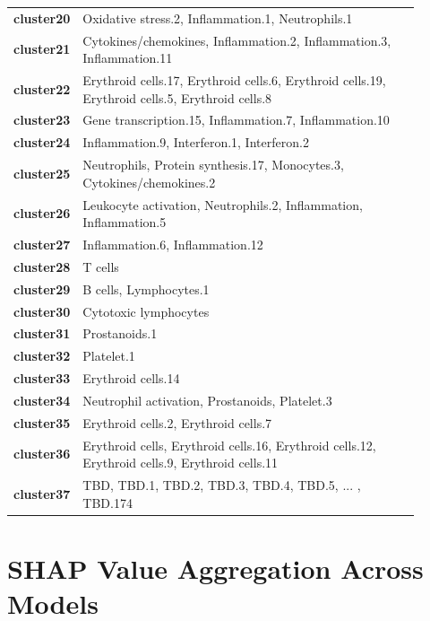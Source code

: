 \documentclass[12pt,a4paper]{report}
\begin{document}
\begin{longtable}{l p{0.9\linewidth} }
\addlinespace
\textbf{cluster20} & Oxidative stress.2, Inflammation.1, Neutrophils.1 \\
\addlinespace
\textbf{cluster21} & Cytokines/chemokines, Inflammation.2, Inflammation.3, Inflammation.11 \\
\addlinespace
\textbf{cluster22} & Erythroid cells.17, Erythroid cells.6, Erythroid cells.19, Erythroid cells.5, Erythroid cells.8 \\
\addlinespace
\textbf{cluster23} & Gene transcription.15, Inflammation.7, Inflammation.10 \\
\addlinespace
\textbf{cluster24} & Inflammation.9, Interferon.1, Interferon.2 \\
\addlinespace
\textbf{cluster25} & Neutrophils, Protein synthesis.17, Monocytes.3, Cytokines/chemokines.2 \\
\addlinespace
\textbf{cluster26} & Leukocyte activation, Neutrophils.2, Inflammation, Inflammation.5 \\
\addlinespace
\textbf{cluster27} & Inflammation.6, Inflammation.12 \\
\addlinespace
\textbf{cluster28} & T cells \\
\addlinespace
\textbf{cluster29} & B cells, Lymphocytes.1 \\
\addlinespace
\textbf{cluster30} & Cytotoxic lymphocytes \\
\addlinespace
\textbf{cluster31} & Prostanoids.1 \\
\addlinespace
\textbf{cluster32} & Platelet.1 \\
\addlinespace
\textbf{cluster33} & Erythroid cells.14 \\
\addlinespace
\textbf{cluster34} & Neutrophil activation, Prostanoids, Platelet.3 \\
\addlinespace
\textbf{cluster35} & Erythroid cells.2, Erythroid cells.7 \\
\addlinespace
\textbf{cluster36} & Erythroid cells, Erythroid cells.16, Erythroid cells.12, Erythroid cells.9, Erythroid cells.11 \\
\addlinespace
\textbf{cluster37} & TBD, TBD.1, TBD.2, TBD.3, TBD.4, TBD.5,  ... , TBD.174\\
\end{longtable}

\pagebreak

\section{SHAP Value Aggregation Across Models}
\label{appendix:shap_aggregation}
\end{document}
